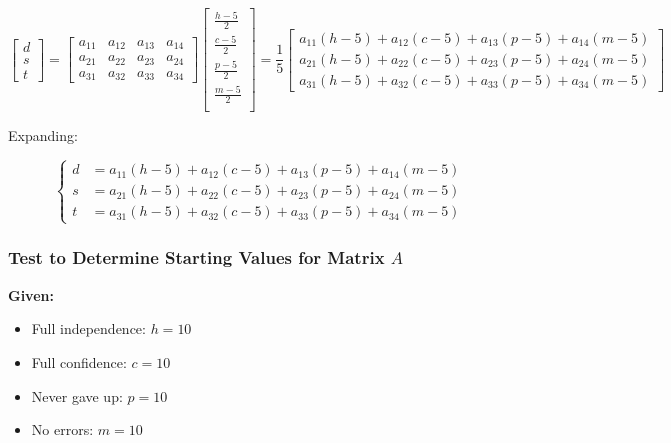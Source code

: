 \documentclass{article}
\begin{document}
        \[
            \begin{bmatrix} d \\ s \\ t \end{bmatrix}
            = 
            \begin{bmatrix} 
                a_{11} & a_{12} & a_{13} & a_{14} \\
                a_{21} & a_{22} & a_{23} & a_{24} \\
                a_{31} & a_{32} & a_{33} & a_{34}
            \end{bmatrix}
            \begin{bmatrix}
                \frac{h-5}{2} \\
                \frac{c-5}{2} \\
                \frac{p-5}{2} \\
                \frac{m-5}{2} \\
            \end{bmatrix}
            =
            \frac{1}{5}
            \begin{bmatrix}
                a_{11}(h - 5) + a_{12}(c - 5) + a_{13}(p - 5) + a_{14}(m - 5) \\
                a_{21}(h - 5) + a_{22}(c - 5) + a_{23}(p - 5) + a_{24}(m - 5) \\
                a_{31}(h - 5) + a_{32}(c - 5) + a_{33}(p - 5) + a_{34}(m - 5)
            \end{bmatrix}
        \]

        Expanding:

        \[
            \left\{
                \begin{aligned}
                    d &= a_{11}(h - 5) + a_{12}(c - 5) + a_{13}(p - 5) + a_{14}(m - 5) \\
                    s &= a_{21}(h - 5) + a_{22}(c - 5) + a_{23}(p - 5) + a_{24}(m - 5) \\
                    t &= a_{31}(h - 5) + a_{32}(c - 5) + a_{33}(p - 5) + a_{34}(m - 5)
                \end{aligned}
            \right.
        \]

    \subsubsection{Test to Determine Starting Values for Matrix $A$}

        \textbf{Given:}
        \begin{itemize}
            \item Full independence: $h = 10$
            \item Full confidence: $c = 10$
            \item Never gave up: $p = 10$
            \item No errors: $m = 10$
        \end{itemize}
\end{document}
